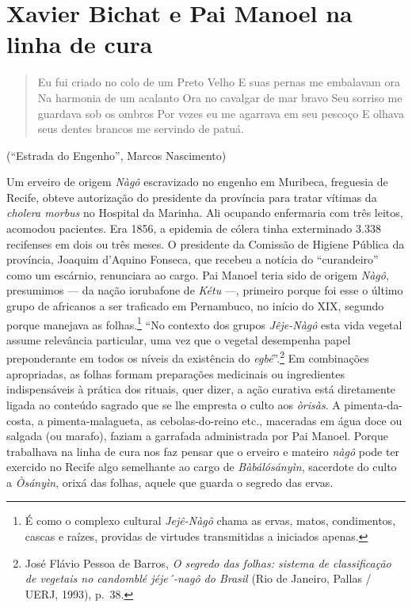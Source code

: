 \chapter{Xavier Bichat e Pai Manoel na linha de cura}

\begin{quote}
Eu fui criado no colo de um Preto Velho E suas pernas me embalavam ora
Na harmonia de um acalanto Ora no cavalgar de mar bravo Seu sorriso me
guardava sob os ombros Por vezes eu me agarrava em seu pescoço E olhava
seus dentes brancos me servindo de patuá.
\end{quote}

(``Estrada do Engenho'', Marcos Nascimento)

Um erveiro de origem \textit{Nàgô} escravizado no engenho em Muribeca,
freguesia de Recife, obteve autorização do presidente da província para
tratar vítimas da \textit{cholera morbus} no Hospital da Marinha. Ali
ocupando enfermaria com três leitos, acomodou pacientes. Era 1856, a
epidemia de cólera tinha exterminado 3.338 recifenses em dois ou três
meses. O presidente da Comissão de Higiene Pública da província, Joaquim
d'Aquino Fonseca, que recebeu a notícia do ``curandeiro'' como um
escárnio, renunciara ao cargo. Pai Manoel teria sido de origem
\textit{Nàgô}, presumimos --- da nação iorubafone de \textit{Kétu­} ---,
primeiro porque foi esse o último grupo de africanos a ser traficado em
Pernambuco, no início do XIX, segundo porque manejava as
folhas.\footnote{É como o complexo cultural \textit{Jejê-Nàgô} chama as
  ervas, matos, condimentos, cascas e raízes, providas de virtudes
  transmitidas a iniciados apenas.} ``No contexto dos grupos
\textit{Jêje-Nàgô} esta vida vegetal assume relevância particular, uma vez
que o vegetal desempenha papel preponderante em todos os níveis da
existência do \textit{egbé}''.\footnote{José Flávio Pessoa de Barros,
  \textit{O segredo das folhas: sistema de classificação de vegetais no
  candomblé jéje´-nagô do Brasil} (Rio de Janeiro, Pallas / UERJ, 1993),
  p.~38.} Em combinações apropriadas, as folhas formam preparações
medicinais ou ingredientes indispensáveis à prática dos rituais, quer
dizer, a ação curativa está diretamente ligada ao conteúdo sagrado que
se lhe empresta o culto aos \textit{òrisàs}. A pimenta-da-costa, a
pimenta-malagueta, as cebolas-do-reino etc., maceradas em água doce ou
salgada (ou marafo), faziam a garrafada administrada por Pai Manoel.
Porque trabalhava na linha de cura nos faz pensar que o erveiro e
mateiro \textit{nàgô} pode ter exercido no Recife algo semelhante ao cargo
de \textit{Bàbálósányìn}, sacerdote do culto a \textit{Òsányìn}, orixá das
folhas, aquele que guarda o segredo das ervas.

